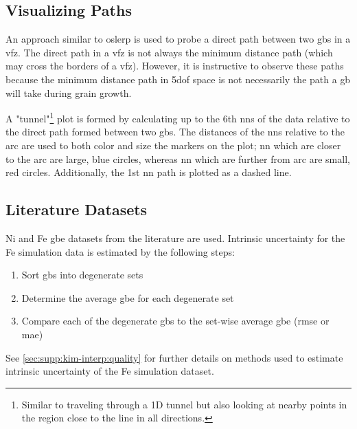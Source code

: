 \documentclass[final,twocolumn,12pt]{elsarticle}
\begin{document}
	\subsection{Visualizing  Paths} \label{sec:methods:path}
	An approach similar to \gls{oslerp} is used to probe a direct path between two \glspl{gb} in a \gls{vfz}. The direct path in a \gls{vfz} is not always the minimum distance path (which may cross the borders of a \gls{vfz}). However, it is instructive to observe these paths because the minimum distance path in \gls{5dof} space is not necessarily the path a \gls{gb} will take during grain growth.
	
	A "tunnel"\footnote{Similar to traveling through a 1D tunnel but also looking at nearby points in the region close to the line in all directions. } plot is formed by calculating up to the 6th \glspl{nn} of the \inpt{} data relative to the direct path formed between two \glspl{gb}. The distances of the \glspl{nn} relative to the arc are used to both color and size the markers on the plot; \gls{nn} which are closer to the arc are large, blue circles, whereas \gls{nn} which are further from arc are small, red circles. Additionally, the 1st \gls{nn} path is plotted as a dashed line.
	
	\subsection{Literature Datasets}
	\label{sec:methods:litdata}
	Ni \cite{olmstedSurveyComputedGrain2009} and Fe \cite{kimPhasefieldModeling3D2014} \gls{gbe} datasets from the literature are used. Intrinsic uncertainty for the Fe simulation data is estimated by the following steps:
	\begin{enumerate}
	    \item Sort \glspl{gb} into degenerate sets
	    \item Determine the average \gls{gbe} for each degenerate set
	    \item Compare each of the degenerate \glspl{gb} to the set-wise average \gls{gbe} (\gls{rmse} or \gls{mae})
	\end{enumerate}
	See \cref{sec:supp:kim-interp:quality} for further details on methods used to estimate intrinsic uncertainty of the Fe simulation dataset.
	
\end{document}
